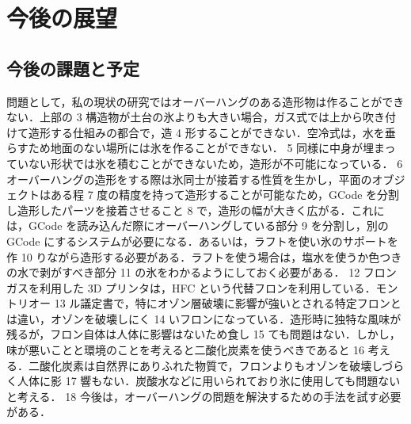 \chapter{今後の展望}
\label{chp:first}

\section{今後の課題と予定}
\label{sec:paragraph}


問題として，私の現状の研究ではオーバーハングのある造形物は作ることができない．上部の
3 構造物が土台の氷よりも大きい場合，ガス式では上から吹き付けて造形する仕組みの都合で，造
4 形することができない．空冷式は，水を垂らすため地面のない場所には氷を作ることができない．
5 同様に中身が埋まっていない形状では氷を積むことができないため，造形が不可能になっている．
6 オーバーハングの造形をする際は氷同士が接着する性質を生かし，平面のオブジェクトはある程
7 度の精度を持って造形することが可能なため，GCode を分割し造形したパーツを接着させること
8 で，造形の幅が大きく広がる．これには，GCode を読み込んだ際にオーバーハングしている部分
9 を分割し，別の GCode にするシステムが必要になる．あるいは，ラフトを使い氷のサポートを作
10 りながら造形する必要がある．ラフトを使う場合は，塩水を使うか色つきの水で剥がすべき部分
11 の氷をわかるようにしておく必要がある．
12 フロンガスを利用した 3D プリンタは，HFC という代替フロンを利用している．モントリオー
13 ル議定書で，特にオゾン層破壊に影響が強いとされる特定フロンとは違い，オゾンを破壊しにく
14 いフロンになっている．造形時に独特な風味が残るが，フロン自体は人体に影響はないため食し
15 ても問題はない．しかし，味が悪いことと環境のことを考えると二酸化炭素を使うべきであると
16 考える．二酸化炭素は自然界にありふれた物質で，フロンよりもオゾンを破壊しづらく人体に影
17 響もない．炭酸水などに用いられており氷に使用しても問題ないと考える．
18 今後は，オーバーハングの問題を解決するための手法を試す必要がある．